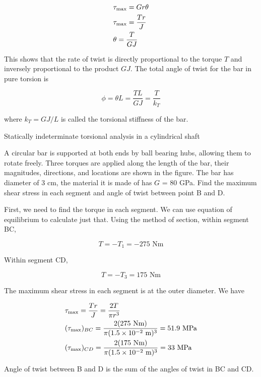 \documentclass[a4paper,openany,12pt]{book}
\begin{document}
$$\begin{gathered}
    \tau _{\max } = Gr\theta \\
    \tau _{\max } = \frac{Tr}{J} \hfill \\
    \theta  = \frac{T}{GJ} \hfill \\ 
  \end{gathered}$$

This shows that the rate of twist is directly proportional to the torque
\(T\) and inversely proportional to the product \(GJ\). The total angle of
twist for the bar in pure torsion is

$$\phi  = \theta L = \frac{TL}{GJ} = \frac{T}{k_T}$$

where \(k_T = GJ/L\) is called the torsional stiffness of the bar.

Statically indeterminate torsional analysis in a cylindrical shaft

A circular bar is supported at both ends by ball bearing hubs, allowing
them to rotate freely. Three torques are applied along the length of the
bar, their magnitudes, directions, and locations are shown in the
figure. The bar has diameter of 3 cm, the material it is made of has \(G\)
= 80 GPa. Find the maximum shear stress in each segment and angle of
twist between point B and D.


First, we need to find the torque in each segment. We can use equation
of equilibrium to calculate just that. Using the method of section,
within segment BC,

$$T =  - T_1 =  - 275\text{ Nm}$$

Within segment CD,

$$T =  - T_3 = 175\text{ Nm}$$

The maximum shear stress in each segment is at the outer diameter. We
have

$$\begin{gathered}
  \tau _{\max } = \frac{Tr}{J} = \frac{2T}{\pi r^3} \hfill \\
  (\tau _{\max })_{BC} = \frac{2(275\text{ Nm})}{\pi (1.5 \times 10^{ - 2}\text{ m})^3} = 51.9\text{ MPa} \hfill \\
  (\tau _{\max })_{CD} = \frac{2(175\text{ Nm})}{\pi (1.5 \times 10^{ - 2}\text{ m})^3} = 33\text{ MPa} \hfill \\ 
\end{gathered}$$

Angle of twist between B and D is the sum of the angles of twist in BC
and CD.
\end{document}
